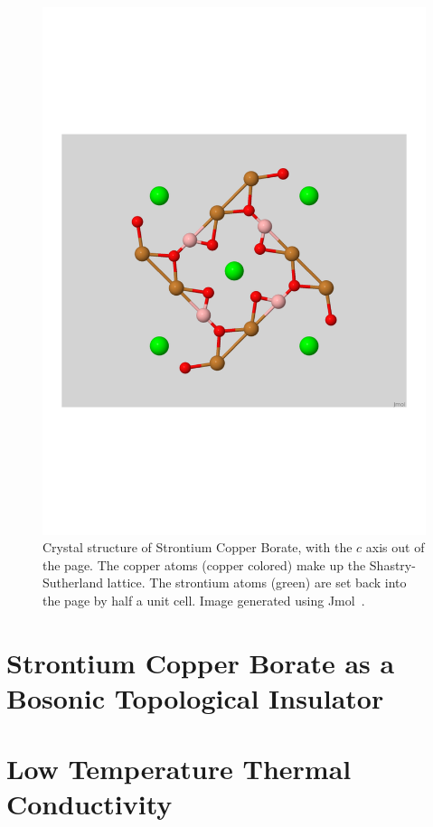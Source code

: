 \documentclass{thesis-umich}
\begin{document}
\begin{figure}
	\caption[Crystal structure of strontium copper borate]{Crystal structure of Strontium Copper Borate, with the $c$ axis out of the page. The copper atoms (copper colored) make up the Shastry-Sutherland lattice. The strontium atoms (green) are set back into the page by half a unit cell. Image generated using Jmol~\cite{jmol}.}
	\includegraphics[width=\columnwidth,trim={0 2.5in 0 2.5in},clip]{figures/scbo.pdf}
\end{figure}
\section{Strontium Copper Borate as a Bosonic Topological Insulator}

\section{Low Temperature Thermal Conductivity}




\end{document}
